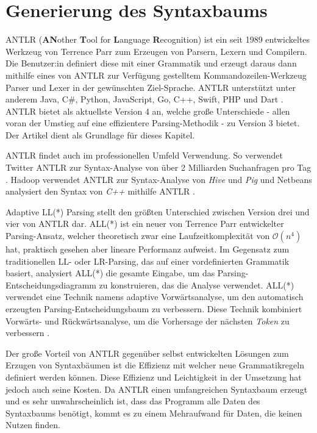 \chapter{Generierung des Syntaxbaums}
\label{cha:antlr}

ANTLR (\textbf{AN}other \textbf{T}ool for \textbf{L}anguage \textbf{R}ecognition) ist ein seit 1989 entwickeltes Werkzeug von Terrence Parr zum Erzeugen von Parsern, Lexern und Compilern. Die Benutzer:in definiert diese mit einer Grammatik und erzeugt daraus dann mithilfe eines von ANTLR zur Verfügung gestelltem Kommandozeilen-Werkzeug Parser und Lexer in der gewünschten Ziel-Sprache. ANTLR unterstützt unter anderem Java, C\#, Python, JavaScript, Go, C++, Swift, PHP und Dart \parencite{antlrtargets}. ANTLR bietet als aktuellste Version 4 an, welche große Unterschiede - allen voran der Umstieg auf eine effizientere Parsing-Methodik - zu Version 3 bietet. Der Artikel \textcite{antlrMegaTutorial} dient als Grundlage für dieses Kapitel.

ANTLR findet auch im professionellen Umfeld Verwendung. So verwendet Twitter ANTLR zur Syntax-Analyse von über 2 Milliarden Suchanfragen pro Tag \parencite{antlrWebsite}. Hadoop verwendet ANTLR zur Syntax-Analyse von \textit{Hive} und \textit{Pig} und Netbeans analysiert den Syntax von \textit{C++} mithilfe ANTLR \parencite{antlrabout}.

Adaptive LL(*) Parsing stellt den größten Unterschied zwischen Version drei und vier von ANTLR dar. ALL(*) ist ein neuer von Terrence Parr entwickelter Parsing-Ansatz, welcher theoretisch zwar eine Laufzeitkomplexität von $\mathcal{O}(n^4)$ hat, praktisch gesehen aber lineare Performanz aufweist. Im Gegensatz zum traditionellen LL- oder LR-Parsing, das auf einer vordefinierten Grammatik basiert, analysiert ALL(*) die gesamte Eingabe, um das Parsing-Entscheidungsdiagramm zu konstruieren, das die Analyse verwendet. ALL(*) verwendet eine Technik namens adaptive Vorwärtsanalyse, um den automatisch erzeugten Parsing-Entscheidungsbaum zu verbessern. Diese Technik kombiniert Vorwärts- und Rückwärtsanalyse, um die Vorhersage der nächsten \textit{Token} zu verbessern \parencite{parr2014adaptive}.

Der große Vorteil von ANTLR gegenüber selbst entwickelten Lösungen zum Erzugen von Syntaxbäumen ist die Effizienz mit welcher neue Grammatikregeln definiert werden können. Diese Effizienz und Leichtigkeit in der Umsetzung hat jedoch auch seine Kosten. Da ANTLR einen umfangreichen Syntaxbaum erzeugt und es sehr unwahrscheinlich ist, dass das Programm alle Daten des Syntaxbaums benötigt, kommt es zu einem Mehraufwand für Daten, die keinen Nutzen finden.

